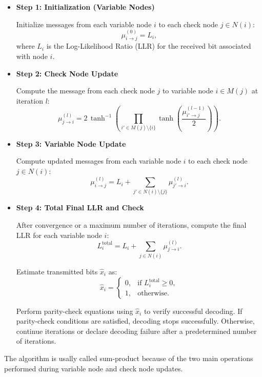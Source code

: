 \begin{itemize}

    \item \textbf{Step 1: Initialization (Variable Nodes)}

    Initialize messages from each variable node $i$ to each check node $j \in N(i)$:
    \[
    \mu_{i \rightarrow j}^{(0)} = L_i,
    \]
    where $L_i$ is the Log-Likelihood Ratio (LLR) for the received bit associated with node $i$.

    \item \textbf{Step 2: Check Node Update}

    Compute the message from each check node $j$ to variable node $i \in M(j)$ at iteration $l$:
    \[
    \mu_{j \rightarrow i}^{(l)} = 2\,\tanh^{-1}\left(\prod_{i' \in M(j)\setminus\{i\}} \tanh\left(\frac{\mu_{i' \rightarrow j}^{(l-1)}}{2}\right)\right).
    \]

    \item \textbf{Step 3: Variable Node Update}

    Compute updated messages from each variable node $i$ to each check node $j \in N(i)$:
    \[
    \mu_{i \rightarrow j}^{(l)} = L_i + \sum_{j' \in N(i)\setminus\{j\}} \mu_{j' \rightarrow i}^{(l)}.
    \]

    \item \textbf{Step 4: Total Final LLR and Check}

    After convergence or a maximum number of iterations, compute the final LLR for each variable node $i$:
    \[
    L_i^{\text{total}} = L_i + \sum_{j \in N(i)} \mu_{j \rightarrow i}^{(l)}.
    \]

    Estimate transmitted bits $\hat{x}_i$ as:
    \[
    \hat{x}_i = 
    \begin{cases}
        0, & \text{if } L_i^{\text{total}} \geq 0,\\[6pt]
        1, & \text{otherwise.}
    \end{cases}
    \]

    Perform parity-check equations using $\hat{x}_i$ to verify successful decoding. If parity-check conditions are satisfied, decoding stops successfully. Otherwise, continue iterations or declare decoding failure after a predetermined number of iterations.

\end{itemize}

The algorithm is usally called sum-product because of the two main operations performed during variable node and check node updates.

